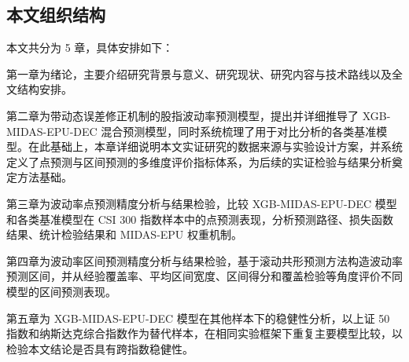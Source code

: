 	
		
		
		
		
		
		
		
		
		
		
		
		
		
		
		
	


\subsection{本文组织结构}

本文共分为 5 章，具体安排如下：

第一章为绪论，主要介绍研究背景与意义、研究现状、研究内容与技术路线以及全文结构安排。

第二章为带动态误差修正机制的股指波动率预测模型，提出并详细推导了 XGB-MIDAS-EPU-DEC 混合预测模型，同时系统梳理了用于对比分析的各类基准模型。在此基础上，本章详细说明本文实证研究的数据来源与实验设计方案，并系统定义了点预测与区间预测的多维度评价指标体系，为后续的实证检验与结果分析奠定方法基础。

第三章为波动率点预测精度分析与结果检验，比较 XGB-MIDAS-EPU-DEC 模型和各类基准模型在 CSI 300 指数样本中的点预测表现，分析预测路径、损失函数结果、统计检验结果和 MIDAS-EPU 权重机制。

第四章为波动率区间预测精度分析与结果检验，基于滚动共形预测方法构造波动率预测区间，并从经验覆盖率、平均区间宽度、区间得分和覆盖检验等角度评价不同模型的区间预测表现。

第五章为 XGB-MIDAS-EPU-DEC 模型在其他样本下的稳健性分析，以上证 50 指数和纳斯达克综合指数作为替代样本，在相同实验框架下重复主要模型比较，以检验本文结论是否具有跨指数稳健性。